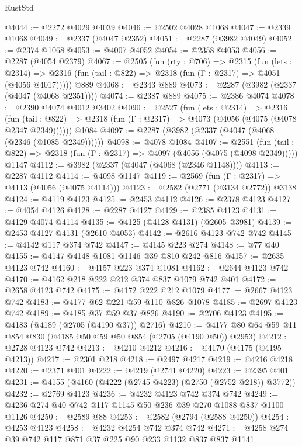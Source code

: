 \begin{lexlean}{RustStd}
\begin{coremodule}
@4044 := @2272 @4029 @4039
@4046 := @2502 @4028 @1068
@4047 := @2339 @1068
@4049 := @2337 (@4047 @2352)
@4051 := @2287 (@3982 @4049)
@4052 := @2374 @1068
@4053 := @4007 @4052
@4054 := @2358 @4053
@4056 := @2287 (@4054 @2379)
@4067 := @2505
    (fun (rty : @706) =>
    @2315
      (fun (lets : @2314) =>
      @2316 (fun (tail : @822) => @2318 (fun (Γ : @2317) => @4051 (@4056 @4017)))))
    @889
@4068 := @2343 @889
@4073 := @2287 (@3982 (@2337 (@4047 (@4068 @2351))))
@4074 := @2387 @889
@4075 := @2386 @4074
@4078 := @2390 @4074 @4012 @3402
@4090 := @2527
    (fun (lets : @2314) =>
    @2316
      (fun (tail : @822) => @2318 (fun (Γ : @2317) => @4073 (@4056 (@4075 (@4078 @2347 @2349))))))
    @1084
@4097 := @2287 (@3982 (@2337 (@4047 (@4068 (@2346 (@1085 @2349))))))
@4098 := @4078 @1084
@4107 := @2551
    (fun (tail : @822) => @2318 (fun (Γ : @2317) => @4097 (@4056 (@4075 (@4098 @2349)))))
    @1147
@4112 := @3982 (@2337 (@4047 (@4068 (@2346 @1148))))
@4113 := @2287 @4112
@4114 := @4098 @1147
@4119 := @2569 (fun (Γ : @2317) => @4113 (@4056 (@4075 @4114)))
@4123 := @2582 (@2771 (@3134 @2772)) @3138
@4124 := @4119 @4123
@4125 := @2453 @4112
@4126 := @2378 @4123
@4127 := @4054 @4126
@4128 := @2287 @4127
@4129 := @2385 @4123
@4131 := @4129 @4074 @4114
@4135 := @4125 (@4128 @4131) (@2605 @3981)
@4139 := @2453 @4127 @4131 (@2610 @4053)
@4142 := @2616 @4123 @742 @742
@4145 := @4142 @117 @374 @742
@4147 := @4145 @223 @274
@4148 := @77 @40
@4155 := @4147 @4148 @1081 @1146 @39 @810 @242 @816
@4157 := @2635 @4123 @742
@4160 := @4157 @223 @374 @1081
@4162 := @2644 @4123 @742
@4170 := @4162 @218 @222 @212 @374 @837 @1079 @742 @401
@4172 := @2658 @4123 @742
@4175 := @4172 @222 @212 @1079
@4177 := @2667 @4123 @742
@4183 := @4177 @62 @221 @59 @110 @826 @1078
@4185 := @2697 @4123 @742
@4189 := @4185 @37 @59 @37 @826
@4190 := @2706 @4123
@4195 := @4183 (@4189 (@2705 (@4190 @37)) @2716)
@4210 := @4177 @80 @64 @59 @11 @854 @830 (@4185 @50 @59 @50 @854 (@2705 (@4190 @50)) @2953)
@4212 := @2728 @4123 @742
@4213 := @4210 @4212
@4216 := @4170 (@4175 (@4195 @4213))
@4217 := @2301 @218
@4218 := @2497 @4217
@4219 := @4216 @4218
@4220 := @2371 @401
@4222 := @4219 (@2741 @4220)
@4223 := @2395 @401
@4231 := @4155 (@4160 (@4222 (@2745 @4223) (@2750 (@2752 @218)) @3772))
@4232 := @2769 @4123
@4236 := @4232 @4123 @742 @374 @742
@4249 := @4236 @274 @40 @742 @117 @1145 @50 @236 @39 @270 @1088 @837 @1100 @1126
@4250 := @2589 @88
@4253 := @2582 (@2794 (@2588 @4250))
@4254 := @4253 @4123
@4258 := @4232 @4254 @742 @374 @742
@4271 := @4258 @274 @39 @742 @117 @871 @37 @225 @90 @233 @1132 @837 @837 @1141

\end{coremodule}
\end{lexlean}
